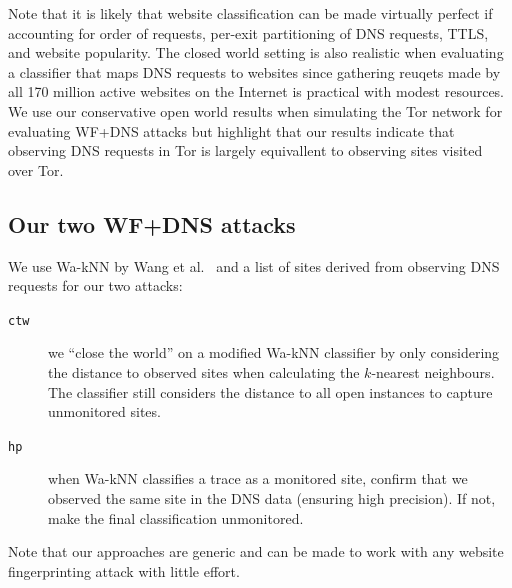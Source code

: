 Note that it is likely that website classification can be made
virtually perfect if accounting for order of requests, per-exit partitioning of
DNS requests, TTLS, and website popularity. The closed world setting
is also realistic when evaluating a classifier that maps DNS requests to
websites since gathering reuqets made by all 170 million active websites on the
Internet is practical with modest resources.
We use our conservative open world results when simulating the Tor network for
evaluating WF+DNS attacks but
highlight that our results indicate that observing DNS requests in Tor is
largely equivallent to observing sites visited over Tor.

\subsection{Our two WF+DNS attacks}
We use Wa-kNN by Wang et al.~\cite{Wang2014a} and a list of sites derived from
observing DNS requests for our two attacks:

\begin{description}
	\item[\texttt{ctw}] we ``close the world''
	on a modified Wa-kNN classifier by only considering the distance to observed
	sites when calculating the $k$-nearest neighbours. The classifier still
	considers the distance to all open instances to capture unmonitored sites.
	\item[\texttt{hp}] when Wa-kNN classifies a trace as a monitored site, confirm
	that we observed the same site in the DNS data (ensuring high precision). If
	not, make the final classification unmonitored.
\end{description}

Note that our approaches are generic and can be made to work with any website
fingerprinting attack with little effort.
